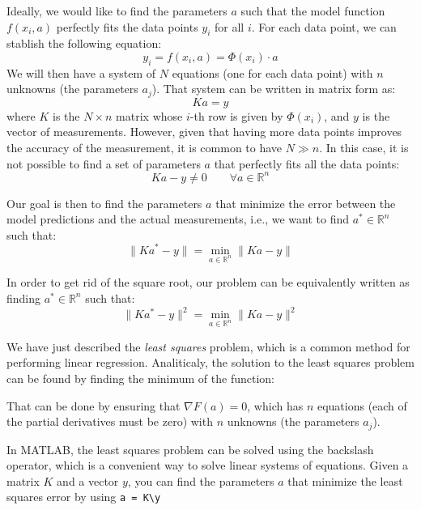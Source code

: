 Ideally, we would like to find the parameters $a$ such that the model function $f(x_i, a)$ perfectly fits the data points $y_i$ for all $i$. For each data point, we can stablish the following equation:
\begin{equation*}
    y_i = f(x_i, a) = \Phi(x_i) \cdot a
\end{equation*}
We will then have a system of $N$ equations (one for each data point) with $n$ unknowns (the parameters $a_j$). That system can be written in matrix form as:
\begin{equation*}
    K a = y
\end{equation*}
where $K$ is the $N \times n$ matrix whose $i$-th row is given by $\Phi(x_i)$, and $y$ is the vector of measurements. However, given that having more data points improves the accuracy of the measurement, it is common to have $N \gg n$. In this case, it is not possible to find a set of parameters $a$ that perfectly fits all the data points:
\begin{equation*}
    K a - y \neq 0\qquad \forall a\in \mathbb{R}^n
\end{equation*}

Our goal is then to find the parameters $a$ that minimize the error between the model predictions and the actual measurements, i.e., we want to find $a^\ast\in \mathbb{R}^n$ such that:
\begin{equation*}
    \| K a^\ast - y \| = \min_{a\in \mathbb{R}^n} \| K a - y \|
\end{equation*}

In order to get rid of the square root, our problem can be equivalently written as finding $a^\ast\in \mathbb{R}^n$ such that:
\begin{equation*}
    \| K a^\ast - y \|^2 = \min_{a\in \mathbb{R}^n} \| K a - y \|^2
\end{equation*}

We have just described the \emph{least squares} problem, which is a common method for performing linear regression. Analiticaly, the solution to the least squares problem can be found by finding the minimum of the function:

That can be done by ensuring that $\nabla F(a) = 0$, which has $n$ equations (each of the partial derivatives must be zero) with $n$ unknowns (the parameters $a_j$).
\begin{observacion}
    In MATLAB, the least squares problem can be solved using the backslash operator, which is a convenient way to solve linear systems of equations. Given a matrix $K$ and a vector $y$, you can find the parameters $a$ that minimize the least squares error by using \texttt{a = K\textbackslash y}
\end{observacion}

